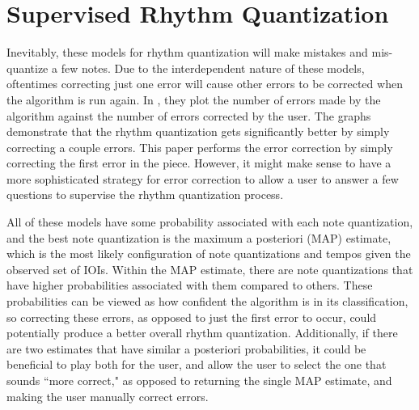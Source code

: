 \documentclass[11pt]{article}
\begin{document}
\section{Supervised Rhythm Quantization}
Inevitably, these models for rhythm quantization will make mistakes and mis-quantize a few notes. Due to the interdependent nature of these models, oftentimes correcting just one error will cause other errors to be corrected when the algorithm is run again. In \cite{raphael}, they plot the number of errors made by the algorithm against the number of errors corrected by the user. The graphs demonstrate that the rhythm quantization gets significantly better by simply correcting a couple errors. This paper performs the error correction by simply correcting the first error in the piece. However, it might make sense to have a more sophisticated strategy for error correction to allow a user to answer a few questions to supervise the rhythm quantization process.

All of these models have some probability associated with each note quantization, and the best note quantization is the maximum a posteriori (MAP) estimate, which is the most likely configuration of note quantizations and tempos given the observed set of IOIs. Within the MAP estimate, there are note quantizations that have higher probabilities associated with them compared to others. These probabilities can be viewed as how confident the algorithm is in its classification, so correcting these errors, as opposed to just the first error to occur, could potentially produce a better overall rhythm quantization. Additionally, if there are two estimates that have similar a posteriori probabilities, it could be beneficial to play both for the user, and allow the user to select the one that sounds ``more correct," as opposed to returning the single MAP estimate, and making the user manually correct errors.


\pagebreak
\end{document}
